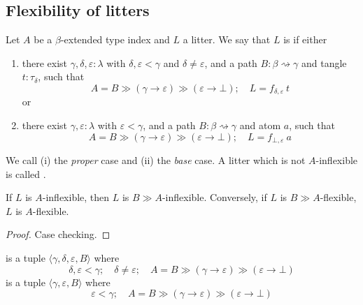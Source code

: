 \subsection{Flexibility of litters}

\begin{definition}
    Let \( A \) be a \( \beta \)-extended type index and \( L \) a litter.
    We say that \( L \) is  if either
    \begin{enumerate}
        \item there exist \( \gamma, \delta, \varepsilon : \lambda \) with \( \delta, \varepsilon < \gamma \) and \( \delta \neq \varepsilon \), and a path \( B : \beta \rightsquigarrow \gamma \) and tangle \( t : \tau_\delta \), such that
        \[ A = B \gg (\gamma \to \varepsilon) \gg (\varepsilon \to \bot);\quad L = f_{\delta,\varepsilon}\ t \]
        or
        \item there exist \( \gamma, \varepsilon : \lambda \) with \( \varepsilon < \gamma \), and a path \( B : \beta \rightsquigarrow \gamma \) and atom \( a \), such that
        \[ A = B \gg (\gamma \to \varepsilon) \gg (\varepsilon \to \bot);\quad L = f_{\bot,\varepsilon}\ a \]
    \end{enumerate}
    We call (i) the \emph{proper} case and (ii) the \emph{base} case.
    A litter which is not \( A \)-inflexible is called .
\end{definition}
\begin{lemma}
    \label{lem:comp_flexible}
    If \( L \) is \( A \)-inflexible, then \( L \) is \( B \gg A \)-inflexible.
    Conversely, if \( L \) is \( B \gg A \)-flexible, \( L \) is \( A \)-flexible.
\end{lemma}
\begin{proof}
    Case checking.
\end{proof}
\begin{definition}
     is a tuple \( \langle \gamma, \delta, \varepsilon, B \rangle \) where
    \[ \delta, \varepsilon < \gamma;\quad \delta \neq \varepsilon; \quad A = B \gg (\gamma \to \varepsilon) \gg (\varepsilon \to \bot) \]
     is a tuple \( \langle \gamma, \varepsilon, B \rangle \) where
    \[ \varepsilon < \gamma; \quad A = B \gg (\gamma \to \varepsilon) \gg (\varepsilon \to \bot) \]
\end{definition}
